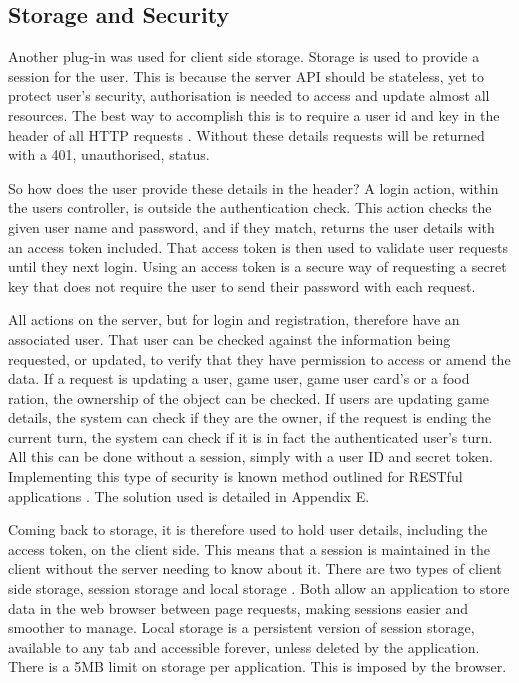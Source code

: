 \subsection{Storage and Security}
Another plug-in was used for client side storage. Storage is used to provide a session for the user. This is because the server API should be stateless, yet to protect user's security, authorisation is needed to access and update almost all resources. The best way to accomplish this is to require a user id and key in the header of all HTTP requests \cite{APISecurity}. Without these details requests will be returned with a 401, unauthorised, status.

So how does the user provide these details in the header? A login action, within the users controller, is outside the authentication check. This action checks the given user name and password, and if they match, returns the user details with an access token included. That access token is then used to validate user requests until they next login. Using an access token is a secure way of requesting a secret key that does not require the user to send their password with each request.

All actions on the server, but for login and registration, therefore have an associated user. That user can be checked against the information being requested, or updated, to verify that they have permission to access or amend the data. If a request is updating a user, game user, game user card's or a food ration, the ownership of the object can be checked. If users are updating game details, the system can check if they are the owner, if the request is ending the current turn, the system can check if it is in fact the authenticated user's turn. All this can be done without a session, simply with a user ID and secret token. Implementing this type of security is known method outlined for RESTful applications \cite{APISecurity}. The solution used is detailed in Appendix E.

Coming back to storage, it is therefore used to hold user details, including the access token, on the client side. This means that a session is maintained in the client without the server needing to know about it. There are two types of client side storage, session storage and local storage \cite{ClientStorage}. Both allow an application to store data in the web browser between page requests, making sessions easier and smoother to manage. Local storage is a persistent version of session storage, available to any tab and accessible forever, unless deleted by the application. There is a 5MB limit on storage per application. This is imposed by the browser.

